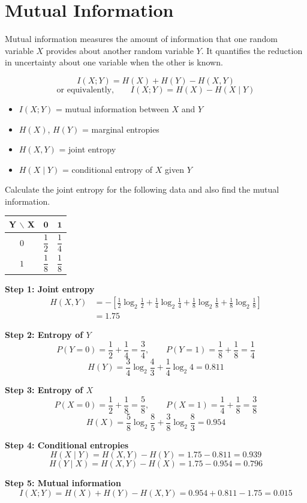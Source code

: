 \documentclass[11pt,a4paper]{book}
\newenvironment{definitionbox}[1][Definition]{%
    \begin{tcolorbox}[
        enhanced,
        breakable,
        colback=primaryblue!10,
        colframe=primaryblue!150,
        title=#1,
        fonttitle=\bfseries,
        sharp corners,
        boxrule=0.8pt,
        left=8pt,
        right=8pt,
        top=6pt,
        bottom=6pt
    ]
}{\end{tcolorbox}}
\newenvironment{formulabox}[1][Formula]{%
    \begin{tcolorbox}[
        enhanced,
        breakable,
        colback=softcoral!10,
        colframe=softcoral!200,
        title=#1,
        fonttitle=\bfseries,
        coltitle=white,
        sharp corners,
        boxrule=1pt,
        left=8pt,
        right=8pt,
        top=6pt,
        bottom=6pt
    ]
}{\end{tcolorbox}}
\newcounter{qna}[chapter]
\renewcommand{\theqna}{\thechapter.\arabic{qna}}
\newenvironment{questionanswerbox}[1][Example]{%
    \refstepcounter{qna}
    \begin{tcolorbox}[
        enhanced,
        breakable,
        colback=softlavender!10,
        colframe=softlavender!200,
        title={#1~\theqna},
        fonttitle=\bfseries,
        coltitle=white,
        colbacktitle=softlavender!200,
        sharp corners,
        boxrule=1pt,
        left=8pt,
        right=8pt,
        top=6pt,
        bottom=6pt
    ]
}{\end{tcolorbox}}
\begin{document}
\section{Mutual Information}

\begin{definitionbox}[Mutual Information]
Mutual information measures the amount of information that one random variable $X$ provides about another random variable $Y$. It quantifies the reduction in uncertainty about one variable when the other is known.
\end{definitionbox}

\begin{formulabox}[Mutual Information Formula]
\[
I(X;Y) = H(X) + H(Y) - H(X,Y)
\]
\[
\text{or equivalently,} \qquad I(X;Y) = H(X) - H(X \mid Y)
\]
\begin{itemize}
    \item $I(X;Y)$ = mutual information between $X$ and $Y$
    \item $H(X)$, $H(Y)$ = marginal entropies
    \item $H(X,Y)$ = joint entropy
    \item $H(X \mid Y)$ = conditional entropy of $X$ given $Y$
\end{itemize}
\end{formulabox}

\begin{questionanswerbox}[Example]
Calculate the joint entropy for the following data and also find the mutual information.

\begin{center}
\begin{tabular}{c|c|c}
\textbf{Y $\backslash$ X} & $\mathbf{0}$ & $\mathbf{1}$ \\ \hline
$0$ & $\dfrac{1}{2}$ & $\dfrac{1}{4}$ \\
$1$ & $\dfrac{1}{8}$ & $\dfrac{1}{8}$
\end{tabular}
\end{center}

\textbf{Step 1: Joint entropy}
\begin{align*}
H(X,Y) &= -\left[\frac{1}{2}\log_2\frac{1}{2} + \frac{1}{4}\log_2\frac{1}{4}
+ \frac{1}{8}\log_2\frac{1}{8} + \frac{1}{8}\log_2\frac{1}{8}\right] \\
&= 1.75
\end{align*}

\textbf{Step 2: Entropy of $Y$}
\[
P(Y=0) = \frac{1}{2} + \frac{1}{4} = \frac{3}{4}, \qquad
P(Y=1) = \frac{1}{8} + \frac{1}{8} = \frac{1}{4}
\]
\[
H(Y) = \frac{3}{4}\log_2\frac{4}{3} + \frac{1}{4}\log_2 4 = 0.811
\]

\textbf{Step 3: Entropy of $X$}
\[
P(X=0) = \frac{1}{2} + \frac{1}{8} = \frac{5}{8}, \qquad
P(X=1) = \frac{1}{4} + \frac{1}{8} = \frac{3}{8}
\]
\[
H(X) = \frac{5}{8}\log_2\frac{8}{5} + \frac{3}{8}\log_2\frac{8}{3} = 0.954
\]

\textbf{Step 4: Conditional entropies}
\[
H(X \mid Y) = H(X,Y) - H(Y) = 1.75 - 0.811 = 0.939
\]
\[
H(Y \mid X) = H(X,Y) - H(X) = 1.75 - 0.954 = 0.796
\]

\textbf{Step 5: Mutual information}
\[
I(X;Y) = H(X) + H(Y) - H(X,Y) = 0.954 + 0.811 - 1.75 = 0.015
\]
\end{questionanswerbox}
\end{document}
